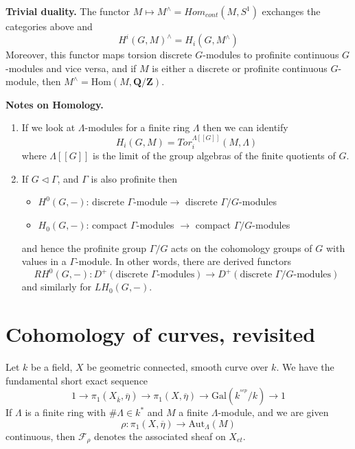 \medskip\noindent
{\bf Trivial duality.}
The functor $M\mapsto  M^\wedge = Hom_{cont}(M, S^1)$
exchanges the categories above and
$$
H^i(G, M)^\wedge = H_i(G, M^\wedge)
$$
Moreover, this functor maps torsion discrete $G$-modules to profinite
continuous $G$-modules and vice versa, and if $M$ is either a discrete or
profinite continuous $G$-module, then
$M^\wedge = \text{Hom}(M, \mathbf{Q}/\mathbf{Z})$.
	
\medskip\noindent
{\bf Notes on Homology.}
\begin{enumerate}
\item If we look at $\Lambda$-modules for a finite ring $\Lambda$
then we can identify
$$
H_i(G, M)=Tor_i^{\Lambda[[G]]}(M, \Lambda)
$$
where $\Lambda[[G]]$ is the limit of the group algebras of the finite
quotients of $G$.
\item If $G \vartriangleleft \Gamma$, and $\Gamma$ is also profinite
then
\begin{itemize}
\item $H^0(G, -)$: discrete $\Gamma$-module$\to$ discrete 
$\Gamma/G$-modules
\item $H_0(G, -)$: compact $\Gamma$-modules $\to$ compact 
$\Gamma/G$-modules
\end{itemize}
and hence the profinite group $\Gamma/G$ acts on the cohomology groups
of $G$ with values in a $\Gamma$-module. In other words, there are derived
functors
$$
RH^0(G, -) :
D^{+}(\text{discrete }\Gamma\text{-modules})
\longrightarrow
D^{+}(\text{discrete }\Gamma/G\text{-modules})
$$
and similarly for $LH_0(G, -)$.
\end{enumerate}








\section{Cohomology of curves, revisited} 
\label{section-cohomology-curves-revisited}

\noindent
Let $k$ be a field, $X$ be geometric connected, smooth curve over $k$.
We have the fundamental short exact sequence
$$
1 \to
\pi_1(X_{\overline k}, \overline \eta) \to
\pi_1(X, \overline\eta) \to
\text{Gal}(k^{^{sep}}/k) \to 1
$$
If $\Lambda$ is a finite ring with $\#\Lambda\in k^*$ and $M$ a finite
$\Lambda$-module, and we are given
$$
\rho:\pi_1(X, \overline\eta) \to \text{Aut}_{\Lambda}(M)
$$
continuous, then $\mathcal{F}_\rho$ denotes the associated sheaf on $X_{et}$.
	
